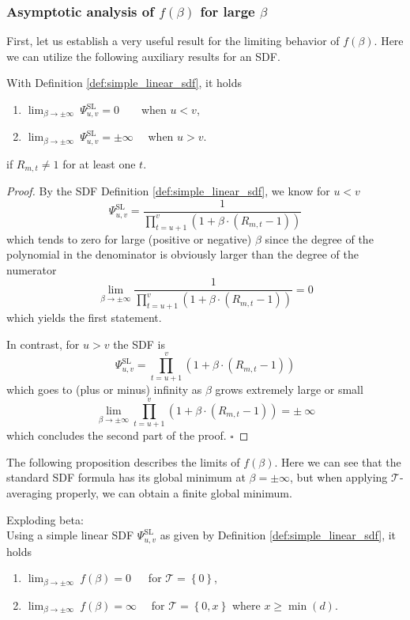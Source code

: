 \subsubsection{Asymptotic analysis of $f(\beta)$ for large $\beta$}


First, let us establish a very useful result for the limiting behavior of $f(\beta)$.
Here we can utilize the following auxiliary results for an SDF.


\begin{lemma}
	\label{lem:limit_simple_linear_sdf}
	With Definition \ref{def:simple_linear_sdf}, it holds
	\begin{enumerate}
		\item $	\lim_{\beta \to \pm \infty} \ \Psi_{u, v}^{\mathrm{SL}}  = 0 \quad \ \ \ $ when $u < v$,
		\item $	\lim_{\beta \to \pm \infty} \ \Psi_{u, v}^{\mathrm{SL}} = \pm \infty \quad$ when $u > v$.
	\end{enumerate}
	if $R_{m,t} \neq  1$ for at least one $t$.
\end{lemma}


\begin{proof}
	By the SDF Definition \ref{def:simple_linear_sdf}, we know for $u<v$
	\[
	\Psi_{u,v}^{\mathrm{SL}} = \frac{1}{\prod_{t=u+1}^{v} \left( 1 + \beta \cdot \left( R_{m,t} - 1\right)  \right)}
	\]
	which tends to zero for large (positive or negative) $\beta$ since the degree of the polynomial in the denominator is obviously larger than the degree of the numerator
	\[
	\lim_{\beta \to \pm \infty} 
	\frac{1}{\prod_{t=u+1}^{v} \left( 1 + \beta \cdot \left( R_{m,t} - 1\right)  \right)} = 0
	\]
	which yields the first statement.
	
	In contrast, for $u>v$ the SDF is
	\[
	\Psi_{u,v}^{\mathrm{SL}} = \prod_{t=u+1}^{v} \left( 1 + \beta \cdot \left( R_{m,t} - 1\right)  \right)
	\]
	which goes to (plus or minus) infinity as $\beta$ grows extremely large or small
	\[
	\lim_{\beta \to \pm \infty} 
	\prod_{t=u+1}^{v} \left( 1 + \beta \cdot \left( R_{m,t} - 1\right)  \right) = \pm \ \infty
	\]
	which concludes the second part of the proof.
	$\square$
\end{proof}


The following proposition describes the limits of $f(\beta)$.
Here we can see that the standard SDF formula has its global minimum at $\beta = \pm \infty$, but when applying $\mathcal{T}$-averaging properly, we can obtain a finite global minimum.


\begin{proposition}
	\label{prop:exploding_beta}
	Exploding beta: \\
	Using a simple linear SDF $\Psi_{u, v}^{\mathrm{SL}}$ as given by Definition \ref{def:simple_linear_sdf}, it holds
	\begin{enumerate}
		\item $	\lim_{\beta \to \pm \infty} \ f(\beta) = 0 \quad \ $ for $\mathcal{T} = \left\{ 0 \right\}$,
		\item $	\lim_{\beta \to \pm \infty} \ f(\beta) = \infty \quad$ for $\mathcal{T} = \left\{ 0, x \right\}$ where $x \geq \min (d) $.
	\end{enumerate}
\end{proposition}


